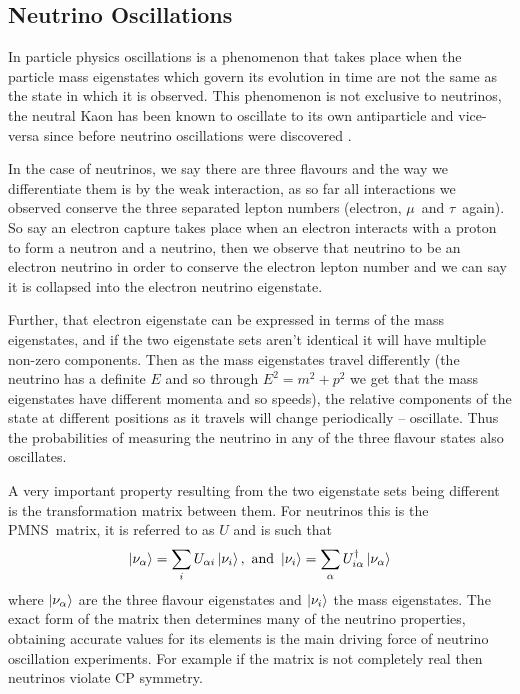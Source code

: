 \documentclass[a4paper,12pt]{article}
\newcommand{\Mu}{$\mu$}
\newcommand{\Tau}{$\tau$}
\begin{document}
\subsection{Neutrino Oscillations}
In particle physics oscillations is a phenomenon that takes place when the particle mass eigenstates which govern its evolution in time are not the same as the state in which it is observed.
This phenomenon is not exclusive to neutrinos, the neutral Kaon has been known to oscillate to its own antiparticle and vice-versa since before neutrino oscillations were discovered \cite{burkhardtWavelengthNeutrinoNeutral2003}.

In the case of neutrinos, we say there are three flavours and the way we differentiate them is by the weak interaction, as so far all interactions we observed conserve the three separated lepton numbers (electron, \Mu\ and \Tau\ again).
So say an electron capture takes place when an electron interacts with a proton to form a neutron and a neutrino, then we observe that neutrino to be an electron neutrino in order to conserve the electron lepton number and we can say it is collapsed into the electron neutrino eigenstate.

Further, that electron eigenstate can be expressed in terms of the mass eigenstates, and if the two eigenstate sets aren't identical it will have multiple non-zero components.
Then as the mass eigenstates travel differently (the neutrino has a definite $E$ and so through $E^2 = m^2 + p^2$ we get that the mass eigenstates have different momenta and so speeds), the relative components of the state at different positions as it travels will change periodically -- oscillate.
Thus the probabilities of measuring the neutrino in any of the three flavour states also oscillates.

A very important property resulting from the two eigenstate sets being different is the transformation matrix between them.
For neutrinos this is the PMNS\footnotemark\ matrix, it is referred to as $U$ and is such that 
\begin{equation}
    \ket{\nu_\alpha} = \sum_i U_{\alpha i} \ket{\nu_i}, \text{ and }
    \ket{\nu_i} = \sum_\alpha U^\dag_{i \alpha} \ket{\nu_\alpha}
\end{equation}
where $\ket{\nu_\alpha}$ are the three flavour eigenstates and $\ket{\nu_i}$ the mass eigenstates.
The exact form of the matrix then determines many of the neutrino properties, obtaining accurate values for its elements is the main driving force of neutrino oscillation experiments.
For example if the matrix is not completely real then neutrinos violate CP symmetry.
\end{document}
